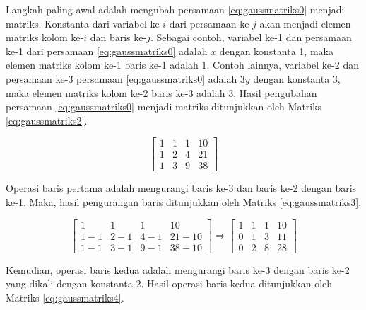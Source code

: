Langkah paling awal adalah mengubah persamaan \ref{eq:gaussmatriks0} menjadi matriks. Konstanta dari variabel ke-$i$ dari persamaan ke-$j$ akan menjadi elemen matriks kolom ke-$i$ dan baris ke-$j$. Sebagai contoh, variabel ke-1 dan persamaan ke-1 dari persamaan \ref{eq:gaussmatriks0} adalah $x$ dengan konstanta 1, maka elemen matriks kolom ke-1 baris ke-1 adalah 1. Contoh lainnya, variabel ke-2 dan persamaan ke-3 persamaan \ref{eq:gaussmatriks0} adalah $3y$ dengan konstanta 3, maka elemen matriks kolom ke-2 baris ke-3 adalah 3. Hasil pengubahan persamaan \ref{eq:gaussmatriks0} menjadi matriks ditunjukkan oleh Matriks \ref{eq:gaussmatriks2}.

\begin{center}
	\setlength\arraycolsep{10pt}
	\begin{equation}
		\begin{bmatrix}
				1 	& 1 	& 1 	& 10 		\\[1em]
				1 	& 2 	& 4 	& 21 		\\[1em]
				1 	& 3 	& 9 	& 38
		\end{bmatrix} \label{eq:gaussmatriks2}
	\end{equation}
\end{center}

Operasi baris pertama adalah mengurangi baris ke-3 dan baris ke-2 dengan baris ke-1. Maka, hasil pengurangan baris ditunjukkan oleh Matriks \ref{eq:gaussmatriks3}.

\begin{center}
	\setlength\arraycolsep{10pt}
	\begin{equation}
		\begin{bmatrix}
				1 			& 1 		& 1 		& 10 				\\[1em]
				1 - 1 	& 2 - 1	& 4 - 1	& 21 - 10		\\[1em]
				1 - 1		& 3 - 1	& 9 - 1	& 38 - 10
		\end{bmatrix} \Rightarrow
		\begin{bmatrix}
				1 	& 1 	& 1 	& 10 		\\[1em]
				0 	& 1 	& 3 	& 11 		\\[1em]
				0 	& 2 	& 8 	& 28
		\end{bmatrix} \label{eq:gaussmatriks3}
	\end{equation}
\end{center}

Kemudian, operasi baris kedua adalah mengurangi baris ke-3 dengan baris ke-2 yang dikali dengan konstanta 2. Hasil operasi baris kedua ditunjukkan oleh Matriks \ref{eq:gaussmatriks4}.

